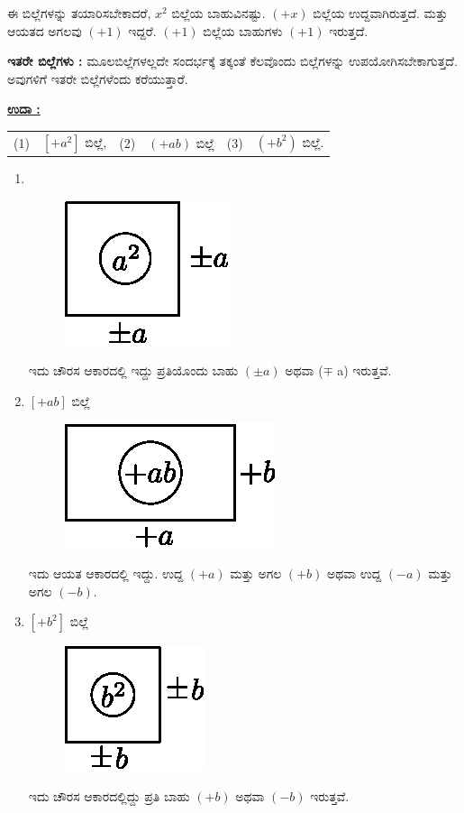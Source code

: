 ಈ ಬಿಲ್ಲೆಗಳನ್ನು ತಯಾರಿಸಬೇಕಾದರೆ, $x^2$ ಬಿಲ್ಲೆಯ ಬಾಹುವಿನಷ್ಟು. $(+x)$ ಬಿಲ್ಲೆಯ ಉದ್ದವಾಗಿರುತ್ತದೆ. ಮತ್ತು ಆಯತದ ಅಗಲವು $(+1)$ ಇದ್ದರೆ.  $(+1)$ ಬಿಲ್ಲೆಯ ಬಾಹುಗಳು $(+1)$ ಇರುತ್ತದೆ.

\noindent
\textbf{ಇತರೇ ಬಿಲ್ಲೆಗಳು :} ಮೂಲಬಿಲ್ಲೆಗಳಲ್ಲದೇ ಸಂದರ್ಭಕ್ಕೆ ತಕ್ಕಂತೆ ಕೆಲವೊಂದು ಬಿಲ್ಲೆಗಳನ್ನು ಉಪಯೋಗಿಸಬೇಕಾಗುತ್ತದೆ. ಅವುಗಳಿಗೆ ಇತರೇ ಬಿಲ್ಲೆಗಳೆಂದು ಕರೆಯುತ್ತಾರೆ.

\noindent
{\textbf{\underline{ಉದಾ :}}} 
\begin{tabular}{llllll}
(1) & $[+ a^2]$ ಬಿಲ್ಲೆ, & (2) & $(+ab)$ ಬಿಲ್ಲೆ & (3) & $(+b^2)$ ಬಿಲ್ಲೆ. 
\end{tabular}

\begin{enumerate}
\item 
~
\begin{figure}[H]
\centering
\includegraphics[scale=0.8]{src/figure/chap3/fig3-5a.eps}
\end{figure}
ಇದು ಚೌರಸ ಆಕಾರದಲ್ಲಿ ಇದ್ದು ಪ್ರತಿಯೊಂದು ಬಾಹು $(\pm a)$ ಅಥವಾ ($\mp$ a) ಇರುತ್ತವೆ. 

\item $[+ab]$ ಬಿಲ್ಲೆ
\begin{figure}[H]
\centering
\includegraphics[scale=0.8]{src/figure/chap3/fig3-5b.eps}
\end{figure}
ಇದು ಆಯತ ಆಕಾರದಲ್ಲಿ ಇದ್ದು. ಉದ್ದ $(+a)$ ಮತ್ತು ಅಗಲ $(+b)$ ಅಥವಾ ಉದ್ದ $(-a)$ ಮತ್ತು ಅಗಲ $(-b)$.

\item $[+b^{2}]$	 ಬಿಲ್ಲೆ
\begin{figure}[H]
\centering
\includegraphics[scale=0.8]{src/figure/chap3/fig3-5c.eps}
\end{figure}
ಇದು ಚೌರಸ ಆಕಾರದಲ್ಲಿದ್ದು ಪ್ರತಿ ಬಾಹು $(+b)$ ಅಥವಾ $(-b)$ ಇರುತ್ತವೆ.


\end{enumerate}
